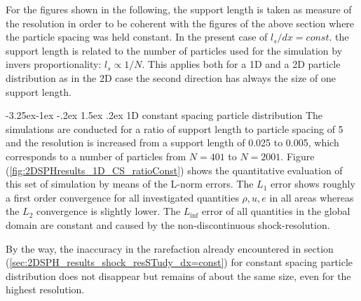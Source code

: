 \documentclass[11pt,a4paper,twoside]{report}
\makeatletter
\renewcommand\paragraph{\@startsection{paragraph}{4}{\z@}%
  {-3.25ex\@plus -1ex \@minus -.2ex}%
  {1.5ex \@plus .2ex}%
  {\normalfont\normalsize\bfseries}}
\makeatother
\begin{document}
For the figures shown in the following, the support length is taken as measure of the resolution in order to be coherent with the figures of the above section where the particle spacing was held constant. In the present case of $l_s/dx=const.$ the support length is related to the number of particles used for the simulation by invers proportionality: $l_s\propto1/N$. This applies both for a 1D and a 2D particle distribution as in the 2D case the second direction has always the size of one support length.

\paragraph{1D constant spacing particle distribution}
The simulations are conducted for a ratio of support length to particle spacing of 5 and the resolution is increased from a support length of 0.025 to 0.005, which corresponds to a number of particles from $N=401$ to $N=2001$. 
Figure (\ref{fig:2DSPHresults_1D_CS_ratioConst}) shows the quantitative evaluation of this set of simulation by means of the L-norm errors. The $L_1$ error shows roughly a first order convergence for all investigated quantities $\rho, u, e$ in all areas whereas the $L_2$ convergence is slightly lower.
The $L_{\inf}$ error of all quantities in the global domain are constant and caused by the non-discontinuous shock-resolution.

By the way, the inaccuracy in the rarefaction already encountered in section (\ref{sec:2DSPH_results_shock_resSTudy_dx=const}) for constant spacing particle distribution does not disappear but remains of about the same size, even for the highest resolution. 

\end{document}
